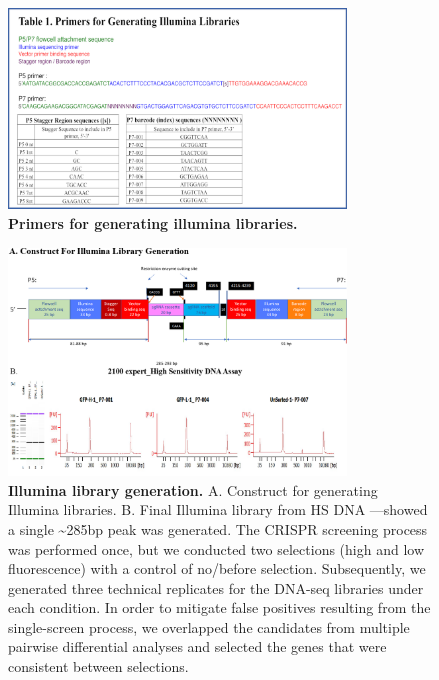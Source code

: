 \documentclass[
  a4paper,
]{article}
\newenvironment{fignos:tagged-figure}[1][]{
  \let\oldfigurename\figurename
  \renewcommand{\figurename}{Supplementary Figure}
}{
  \let\figurename\oldfigurename
}
\begin{document}
\begin{fignos:tagged-figure}[S11]

\begin{figure}
\hypertarget{fig:sup:crispr:table1}{%
\centering
\includegraphics[width=0.8\textwidth,height=\textheight]{images/crispr/table1.png}
\caption{\textbf{Primers for generating illumina libraries.}}\label{fig:sup:crispr:table1}
}
\end{figure}

\end{fignos:tagged-figure}

\begin{fignos:tagged-figure}[S12]

\begin{figure}
\hypertarget{fig:sup:crispr:fig4}{%
\centering
\includegraphics[width=0.8\textwidth,height=\textheight]{images/crispr/figure4.png}
\caption{\textbf{Illumina library generation.}
A. Construct for generating Illumina libraries.
B. Final Illumina library from HS DNA ---showed a single \textasciitilde285bp peak was generated.
The CRISPR screening process was performed once, but we conducted two selections (high and low fluorescence) with a control of no/before selection. Subsequently, we generated three technical replicates for the DNA-seq libraries under each condition. In order to mitigate false positives resulting from the single-screen process, we overlapped the candidates from multiple pairwise differential analyses and selected the genes that were consistent between selections.}\label{fig:sup:crispr:fig4}
}
\end{figure}

\end{fignos:tagged-figure}
\end{document}
